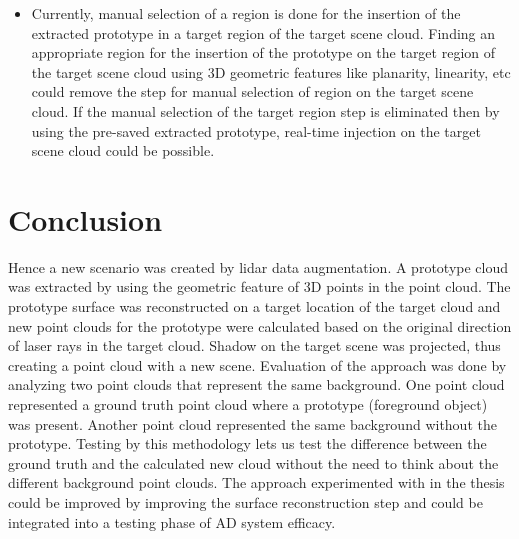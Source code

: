 \begin{itemize}
    \item Currently, manual selection of a region is done for the insertion of the extracted prototype in a target region of the target scene cloud. Finding an appropriate region for the insertion of the prototype on the target region of the target scene cloud using 3D geometric features like planarity, linearity, etc could remove the step for manual selection of region on the target scene cloud. If the manual selection of the target region step is eliminated then by using the pre-saved extracted prototype, real-time injection on the target scene cloud could be possible.
\end{itemize}

\section{Conclusion}
Hence a new scenario was created by lidar data augmentation. A prototype cloud was extracted by using the geometric feature of 3D points in the point cloud. The prototype surface was reconstructed on a target location of the target cloud and new point clouds for the prototype were calculated based on the original direction of laser rays in the target cloud. Shadow on the target scene was projected, thus creating a point cloud with a new scene. Evaluation of the approach was done by analyzing two point clouds that represent the same background. One point cloud represented a ground truth point cloud where a prototype (foreground object) was present. Another point cloud represented the same background without the prototype. Testing by this methodology lets us test the difference between the ground truth and the calculated new cloud without the need to think about the different background point clouds. The approach experimented with in the thesis could be improved by improving the surface reconstruction step and could be integrated into a testing phase of AD system efficacy.